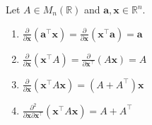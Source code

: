 \documentclass[12pt]{article}
\begin{document}
\begin{theorem}
Let $A \in M_n(\mathbb{R})$ and $\mathbf{a}, \mathbf{x} \in \mathbb{R}^n$.
\begin{enumerate}
    \item $\frac{\partial}{\partial \mathbf{x}} (\mathbf{a}^\top \mathbf{x}) = \frac{\partial}{\partial \mathbf{x}} (\mathbf{x}^\top \mathbf{a}) = \mathbf{a}$
    \item $\frac{\partial}{\partial \mathbf{x}} (\mathbf{x}^\top A) = \frac{\partial}{\partial \mathbf{x}^\top} (A\mathbf{x}) = A$
    \item $\frac{\partial}{\partial \mathbf{x}} (\mathbf{x}^\top A \mathbf{x}) = (A + A^\top)\mathbf{x}$
    \item $\frac{\partial^2}{\partial \mathbf{x} \partial \mathbf{x}^\top} (\mathbf{x}^\top A \mathbf{x}) = A + A^\top$
\end{enumerate}
\end{theorem}
\end{document}
